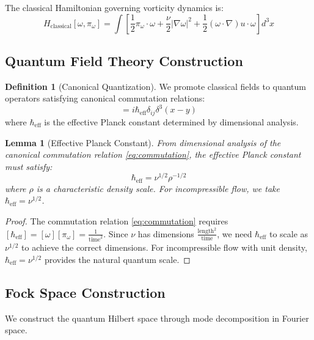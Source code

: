 \documentclass[11pt,a4paper]{article}
\newtheorem{lemma}[theorem]{Lemma}
\theoremstyle{definition}
\newtheorem{definition}[theorem]{Definition}
\theoremstyle{remark}
\newcommand{\heff}{\hbar_{\text{eff}}}
\newcommand{\omegahat}{\hat{\omega}}
\newcommand{\pihat}{\hat{\pi}}
\begin{document}
The classical Hamiltonian governing vorticity dynamics is:
\begin{equation}
H_{\text{classical}}[\omega, \pi_\omega] = \int \left[\frac{1}{2}\pi_\omega \cdot \omega + \frac{\nu}{2}|\nabla \omega|^2 + \frac{1}{2}(\omega \cdot \nabla)u \cdot \omega\right] d^3x
\label{eq:classical_hamiltonian}
\end{equation}

\subsection{Quantum Field Theory Construction}

\begin{definition}[Canonical Quantization]
\label{def:quantization}
We promote classical fields to quantum operators satisfying canonical commutation relations:
\begin{equation}
[\omegahat_i(x), \pihat_{\omega_j}(y)] = i\heff \delta_{ij} \delta^3(x-y)
\label{eq:commutation}
\end{equation}
where $\heff$ is the effective Planck constant determined by dimensional analysis.
\end{definition}

\begin{lemma}[Effective Planck Constant]
\label{lem:heff}
From dimensional analysis of the canonical commutation relation \eqref{eq:commutation}, the effective Planck constant must satisfy:
\begin{equation}
\heff = \nu^{1/2} \rho^{-1/2}
\end{equation}
where $\rho$ is a characteristic density scale. For incompressible flow, we take $\heff = \nu^{1/2}$.
\end{lemma}

\begin{proof}
The commutation relation \eqref{eq:commutation} requires $[\heff] = [\omega][\pi_\omega] = \frac{1}{\text{time}^2}$. 
Since $\nu$ has dimensions $\frac{\text{length}^2}{\text{time}}$, we need $\heff$ to scale as $\nu^{1/2}$ to achieve the correct dimensions. For incompressible flow with unit density, $\heff = \nu^{1/2}$ provides the natural quantum scale.
\end{proof}

\subsection{Fock Space Construction}

We construct the quantum Hilbert space through mode decomposition in Fourier space.
\end{document}
